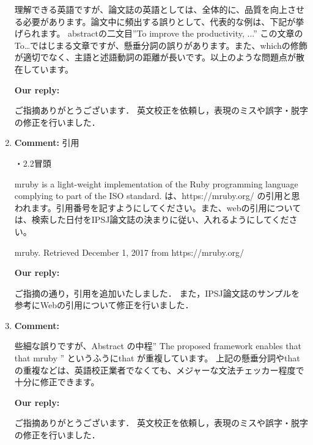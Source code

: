 \documentclass{article}
\begin{document}
\begin{enumerate}
\begin{flushleft}
理解できる英語ですが、論文誌の英語としては、全体的に、品質を向上させる必要があります。論文中に頻出する誤りとして、代表的な例は、下記が挙げられます。
abstractの二文目”To improve the productivity, ...”
この文章のTo…ではじまる文章ですが、懸垂分詞の誤りがあります。また、whichの修飾が適切でなく、主語と述語動詞の距離が長いです。以上のような問題点が散在しています。
\end{flushleft}

\begin{flushleft}
\textbf{Our reply:}

ご指摘ありがとうございます．
英文校正を依頼し，表現のミスや誤字・脱字の修正を行いました．
\end{flushleft}

\item \begin{flushleft}
\textbf{Comment:} 引用

・2.2冒頭

mruby is a light-weight implementation of the Ruby programming language complying to part of the ISO standard.
は、https://mruby.org/
の引用と思われます。引用番号を記すようにしてください。また、webの引用については、検索した日付をIPSJ論文誌の決まりに従い、入れるようにしてください。

mruby. Retrieved December 1, 2017 from https://mruby.org/
\end{flushleft}

\begin{flushleft}
\textbf{Our reply:}

ご指摘の通り，引用を追加いたしました．
また，IPSJ論文誌のサンプルを参考にWebの引用について修正を行いました．
\end{flushleft}

\item \begin{flushleft}
\textbf{Comment:} 

些細な誤りですが、Abstract の中程” The proposed framework enables that that mruby ” というふうにthat が重複しています。
上記の懸垂分詞やthatの重複などは、英語校正業者でなくても、メジャーな文法チェッカー程度で十分に修正できます。

\end{flushleft}

\begin{flushleft}
\textbf{Our reply:}

ご指摘ありがとうございます．
英文校正を依頼し，表現のミスや誤字・脱字の修正を行いました．
\end{flushleft}

\end{enumerate}
\end{document}
